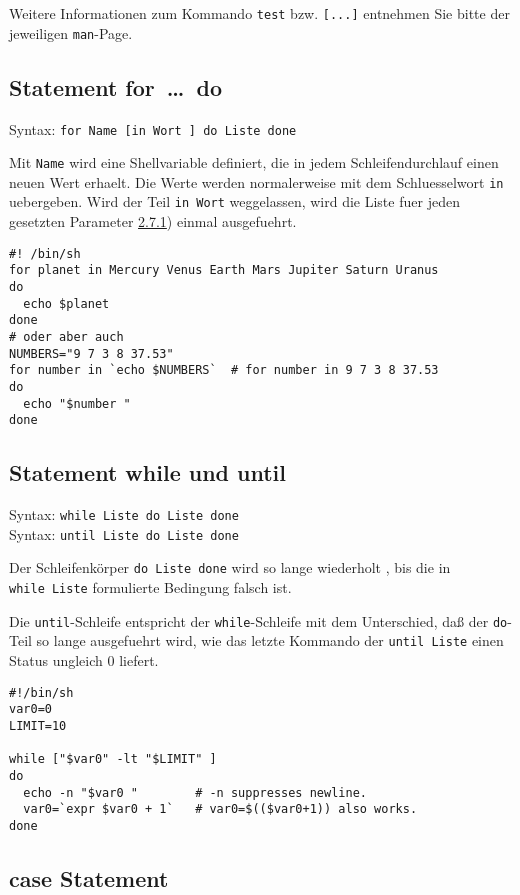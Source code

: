 \documentclass[12pt,]{article}
\begin{document}
Weitere Informationen zum Kommando \texttt{test} bzw. \texttt{{[}...{]}}
entnehmen Sie bitte der jeweiligen \texttt{man}-Page.

\subsection{Statement for~\ldots{}~do}\label{statement-fordo}

Syntax: \texttt{for\ Name\ {[}in\ Wort\ {]}\ do\ Liste\ done}

Mit \texttt{Name} wird eine Shellvariable definiert, die in jedem
Schleifendurchlauf einen neuen Wert erhaelt. Die Werte werden
normalerweise mit dem Schluesselwort \texttt{in} uebergeben. Wird der
Teil \texttt{in\ Wort} weggelassen, wird die Liste fuer jeden gesetzten
Parameter \href{node3.html\#ssec:positionsparameter}{2.7.1}) einmal
ausgefuehrt.

\begin{verbatim}
#! /bin/sh
for planet in Mercury Venus Earth Mars Jupiter Saturn Uranus
do
  echo $planet
done
# oder aber auch
NUMBERS="9 7 3 8 37.53"
for number in `echo $NUMBERS`  # for number in 9 7 3 8 37.53
do
  echo "$number "
done
\end{verbatim}

\subsection{Statement while und until}\label{statement-while-und-until}

Syntax: \texttt{while\ Liste\ do\ Liste\ done}\\
Syntax: \texttt{until\ Liste\ do\ Liste\ done}

Der Schleifenkörper \texttt{do\ Liste\ done} wird so lange wiederholt ,
bis die in \texttt{while\ Liste} formulierte Bedingung falsch ist.

Die \texttt{until}-Schleife entspricht der \texttt{while}-Schleife mit
dem Unterschied, daß der \texttt{do}-Teil so lange ausgefuehrt wird, wie
das letzte Kommando der \texttt{until\ Liste} einen Status ungleich 0
liefert.

\begin{verbatim}
#!/bin/sh
var0=0
LIMIT=10

while ["$var0" -lt "$LIMIT" ]
do
  echo -n "$var0 "        # -n suppresses newline.
  var0=`expr $var0 + 1`   # var0=$(($var0+1)) also works.
done
\end{verbatim}

\subsection{case Statement}\label{case-statement}
\end{document}
